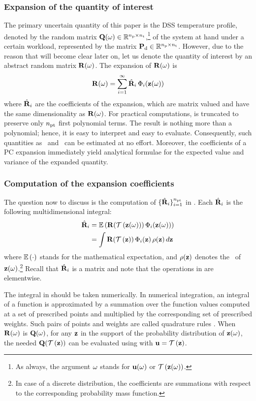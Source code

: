 \subsubsection{Expansion of the quantity of interest}
The primary uncertain quantity of this paper is the DSS temperature profile, denoted by the random matrix $\mathbf{Q}(\omega) \in \mathbb{R}^{{n_\text{p}} \times {n_\text{t}}}$,\footnote{As always, the argument $\omega$ stands for $\mathbf{u}(\omega)$ or $\oTransform{\vZ(\o)}$.} of the system at hand under a certain workload, represented by the matrix $\mathbf{P}_{\text{d}} \in \mathbb{R}^{{n_\text{p}} \times {n_\text{t}}}$.
However, due to the reason that will become clear later on, let us denote the quantity of interest by an abstract random matrix $\mathbf{R}(\omega)$.
The expansion of $\mathbf{R}(\omega)$ is
\begin{equation} \elabel{polynomial-chaos-expansion}
  \mR(\o) = \sum_{i = 1}^\infty \pcc{\mR}_i \, \pcb_i(\vZ(\o))
\end{equation}
where $\hat{\mathbf{R}}_i$ are the coefficients of the expansion, which are matrix valued and have the same dimensionality as $\mathbf{R}(\omega)$.
For practical computations,  is truncated to preserve only ${n_\text{pt}}$ first polynomial terms.
The result is nothing more than a polynomial; hence, it is easy to interpret and easy to evaluate.
Consequently, such quantities as \cdfs\ and \pdfs\ can be estimated at no effort.
Moreover, the coefficients of a PC expansion immediately yield analytical formulae for the expected value and variance of the expanded quantity.

\subsubsection{Computation of the expansion coefficients}
The question now to discuss is the computation of $\{ \hat{\mathbf{R}}_i \}_{i = 1}^{n_\text{pt}}$ in .
Each $\hat{\mathbf{R}}_i$ is the following multidimensional integral:
\begin{align}
  \pcc{\mR}_i & = \fExp{\mR(\oTransform{\vZ(\o)}) \, \pcb_i(\vZ(\o))} \nonumber \\
  & = \int \mR(\oTransform{\vZ}) \, \pcb_i(\vZ) \, \fPDF(\vZ) \, \d\vZ \elabel{polynomial-chaos-coefficients}
\end{align}
where $\mathbb{E}\left(\cdot\right)$ stands for the mathematical expectation, and $\rho(\mathbf{z})$ denotes the \pdf\ of $\mathbf{z}(\omega)$.\footnote{In case of a discrete distribution, the coefficients are summations with respect to the corresponding probability mass function.}
Recall that $\hat{\mathbf{R}}_i$ is a matrix and note that the operations in  are elementwise.

The integral in  should be taken numerically.
In numerical integration, an integral of a function is approximated by a summation over the function values computed at a set of prescribed points and multiplied by the corresponding set of prescribed weights.
Such pairs of points and weights are called quadrature rules \cite{press2007}.
When $\mathbf{R}(\omega)$ is $\mathbf{Q}(\omega)$, for any $\mathbf{z}$ in the support of the probability distribution of $\mathbf{z}(\omega)$, the needed $\mQ(\oTransform{\vZ})$ can be evaluated using  with $\vU = \oTransform{\vZ}$.
